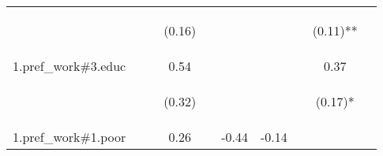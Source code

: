 \begin{center}
\begin{tabular}{lccccccccc}
 & \begin{footnotesize}\end{footnotesize} & \begin{footnotesize}\end{footnotesize} & \begin{footnotesize}(0.16)\end{footnotesize} & \begin{footnotesize}\end{footnotesize} & \begin{footnotesize}\end{footnotesize} & \begin{footnotesize}\end{footnotesize} & \begin{footnotesize}\end{footnotesize} & \begin{footnotesize}(0.11)**\end{footnotesize} & \begin{footnotesize}\end{footnotesize}\\
\noalign{\smallskip}1.pref_work\#3.educ &  &  & 0.54 &  &  &  &  & 0.37 & \\
 & \begin{footnotesize}\end{footnotesize} & \begin{footnotesize}\end{footnotesize} & \begin{footnotesize}(0.32)\end{footnotesize} & \begin{footnotesize}\end{footnotesize} & \begin{footnotesize}\end{footnotesize} & \begin{footnotesize}\end{footnotesize} & \begin{footnotesize}\end{footnotesize} & \begin{footnotesize}(0.17)*\end{footnotesize} & \begin{footnotesize}\end{footnotesize}\\
\noalign{\smallskip}1.pref_work\#1.poor &  &  & 0.26 &  & -0.44 & -0.14 &  &  & \\

\end{tabular}
\end{center}
